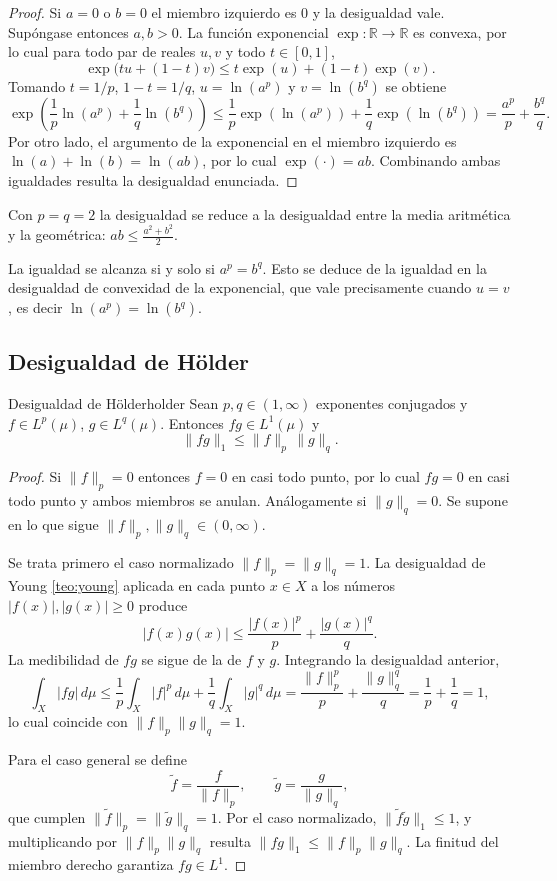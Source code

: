 \documentclass[11pt, a4paper]{article}
\begin{document}
\begin{proof}
Si $a = 0$ o $b = 0$ el miembro izquierdo es $0$ y la desigualdad vale. Supóngase entonces
$a, b > 0$. La función
exponencial $\exp: \mathbb{R} \to \mathbb{R}$ es convexa, por lo cual para todo par de reales
$u, v$ y todo $t \in [0, 1]$,
$$ \exp\big(tu + (1-t)v\big) \le t \exp(u) + (1-t)\exp(v). $$
Tomando $t = 1/p$, $1 - t = 1/q$, $u = \ln(a^p)$ y $v = \ln(b^q)$ se obtiene
$$ \exp\!\left(\frac{1}{p} \ln(a^p) + \frac{1}{q} \ln(b^q)\right)
\le \frac{1}{p} \exp(\ln(a^p)) + \frac{1}{q} \exp(\ln(b^q)) = \frac{a^p}{p} + \frac{b^q}{q}. $$
Por otro lado, el argumento de la exponencial en el miembro izquierdo es $\ln(a) + \ln(b) =
\ln(ab)$, por lo cual $\exp(\cdot) = ab$. Combinando ambas igualdades resulta la desigualdad
enunciada.
\end{proof}

\obs Con $p = q = 2$ la desigualdad se reduce a la desigualdad entre la media aritmética y la
geométrica: $ab \le \tfrac{a^2 + b^2}{2}$.

\obs La igualdad se alcanza si y solo si $a^p = b^q$. Esto se deduce de la igualdad en la
desigualdad de convexidad de la exponencial, que vale precisamente cuando $u = v$, es decir
$\ln(a^p) = \ln(b^q)$.

\subsection{Desigualdad de Hölder}

\begin{teorema}{Desigualdad de Hölder}{holder}
Sean $p, q \in (1, \infty)$ exponentes conjugados y $f \in L^p(\mu)$, $g \in L^q(\mu)$. Entonces
$fg \in L^1(\mu)$ y
$$ \|fg\|_1 \le \|f\|_p \, \|g\|_q. $$
\end{teorema}

\begin{proof}
Si $\|f\|_p = 0$ entonces $f = 0$ en casi todo punto, por lo cual $fg = 0$ en casi todo punto y
ambos miembros se anulan. Análogamente si $\|g\|_q = 0$. Se supone en lo que sigue
$\|f\|_p, \|g\|_q \in (0, \infty)$.

Se trata primero el caso normalizado $\|f\|_p = \|g\|_q = 1$. La desigualdad de Young
\ref{teo:young} aplicada
en cada punto $x \in X$ a los números $|f(x)|, |g(x)| \ge 0$ produce
$$ |f(x) g(x)| \le \frac{|f(x)|^p}{p} + \frac{|g(x)|^q}{q}. $$
La medibilidad de $fg$ se sigue de la de $f$ y $g$. Integrando la desigualdad anterior,
$$ \int_X |fg| \, d\mu \le \frac{1}{p} \int_X |f|^p \, d\mu + \frac{1}{q} \int_X |g|^q \, d\mu
= \frac{\|f\|_p^p}{p} + \frac{\|g\|_q^q}{q} = \frac{1}{p} + \frac{1}{q} = 1, $$
lo cual coincide con $\|f\|_p \|g\|_q = 1$.

Para el caso general se define
$$ \widetilde{f} = \frac{f}{\|f\|_p}, \qquad \widetilde{g} = \frac{g}{\|g\|_q}, $$
que cumplen $\|\widetilde{f}\|_p = \|\widetilde{g}\|_q = 1$. Por el caso normalizado,
$\|\widetilde{f} \widetilde{g}\|_1 \le 1$, y multiplicando por $\|f\|_p \|g\|_q$ resulta
$\|fg\|_1 \le \|f\|_p \|g\|_q$. La finitud del miembro derecho garantiza $fg \in L^1$.
\end{proof}
\end{document}
